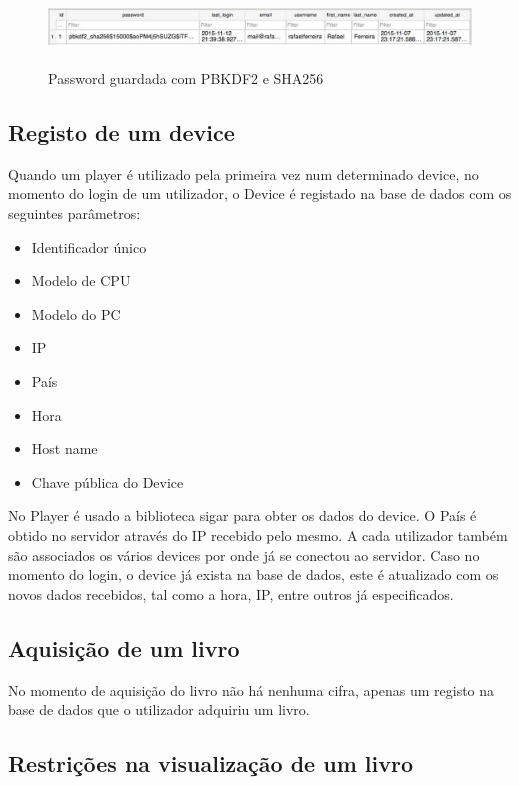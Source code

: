 \documentclass[pdftex,12pt,a4paper]{report}
\begin{document}
\begin{figure}[!htb]
\center
 \includegraphics[width=150mm,scale=1]{pbkdf2_saved.pdf}
 \caption{\\Password guardada com PBKDF2 e SHA256}
 \label{fig:eer}
\end{figure}

\subsection{Registo de um device}
Quando um player é utilizado pela primeira vez num determinado device, no momento do login de um utilizador, o Device é registado na base de dados com os seguintes parâmetros:

\begin{itemize}
\item Identificador único
\item Modelo de CPU
\item Modelo do PC
\item IP
\item País
\item Hora
\item Host name
\item Chave pública do Device
\end{itemize}

	No Player é usado a biblioteca sigar para obter os dados do device. O País é obtido no servidor através do IP recebido pelo mesmo.
	A cada utilizador também são associados os vários devices por onde já se conectou ao servidor.
	Caso no momento do login, o device já exista na base de dados, este é atualizado com os novos dados recebidos, tal como a hora, IP, entre outros já especificados.

\subsection{Aquisição de um livro}

No momento de aquisição do livro não há nenhuma cifra, apenas um registo na base de dados que o utilizador adquiriu um livro.

\subsection{Restrições na visualização de um livro}
\end{document}
